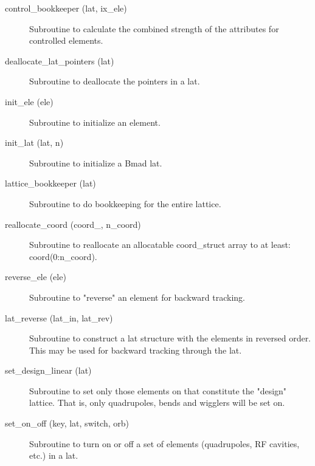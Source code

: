 \begin{description}

\label{r:control.bookkeeper}
\item[control_bookkeeper (lat, ix_ele)] \Newline
Subroutine to calculate the combined strength of the attributes for
controlled elements.

\label{r:deallocate.lat.pointers}
\item[deallocate_lat_pointers (lat)] \Newline 
Subroutine to deallocate the pointers in a lat.

\label{r:init.ele}
\item[init_ele (ele)] \Newline
Subroutine to initialize an element. 

\label{r:init.lat}
\item[init_lat (lat, n)] \Newline 
Subroutine to initialize a Bmad lat.

\label{r:lattice.bookkeeper}
\item[lattice_bookkeeper (lat)] \Newline 
Subroutine to do bookkeeping for the entire lattice.

\label{r:reallocate.coord}
\item[reallocate_coord (coord_, n_coord)] \Newline 
Subroutine to reallocate an allocatable  coord_struct array to at least:
coord(0:n_coord).

\label{r:reverse.ele}
\item[reverse_ele (ele)] \Newline
Subroutine to "reverse" an element for backward tracking. 

\label{r:lat.reverse}
\item[lat_reverse (lat_in, lat_rev)] \Newline
Subroutine to construct a lat structure with the elements in reversed 
order. This may be used for backward tracking through the lat. 

\label{r:set.design.linear}
\item[set_design_linear (lat)] \Newline
Subroutine to set only those elements on that constitute the "design" 
lattice. That is, only quadrupoles, bends and wigglers will be set on. 

\label{r:set.on.off}
\item[set_on_off (key, lat, switch, orb)] \Newline
Subroutine to turn on or off a set of elements (quadrupoles,
RF cavities, etc.) in a lat.


\end{description}

